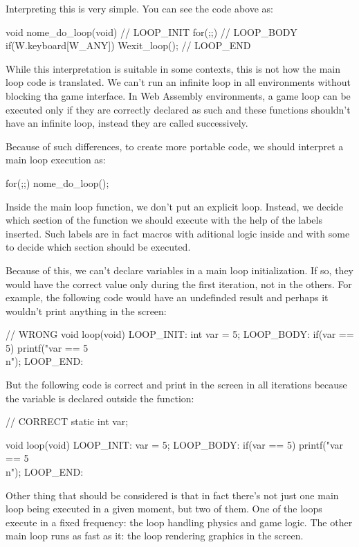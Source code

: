 Interpreting this is very simple. You can see the code above as:

\alinhaverbatim
void nome\_do\_loop(void){
  // LOOP\_INIT
  for(;;){
    // LOOP\_BODY
    if(W.keyboard[W\_ANY])
        Wexit\_loop();
  }
  // LOOP\_END
}
\alinhanormal

While this interpretation is suitable in some contexts, this is not
how the main loop code is translated. We can't run an infinite loop in
all environments without blocking tha game interface. In Web Assembly
environments, a game loop can be executed only if they are correctly
declared as such and these functions shouldn't have an infinite loop,
instead they are called successively.

Because of such differences, to create more portable code, we should
interpret a main loop execution as:

\alinhaverbatim
for(;;)
  nome\_do\_loop();
\alinhanormal

Inside the main loop function, we don't put an explicit loop. Instead,
we decide which section of the function we should execute with the
help of the labels inserted. Such labels are in fact macros with
aditional logic inside and with some  to decide which
section should be executed.

Because of this, we can't declare variables in a main loop
initialization. If so, they would have the correct value only during
the first iteration, not in the others. For example, the following
code would have an undefinded result and perhaps it wouldn't print
anything in the screen:

\alinhaverbatim
// WRONG
void loop(void){
LOOP\_INIT:
  int var = 5;
LOOP\_BODY:
  if(var == 5)
    printf("var == 5\\n");
LOOP\_END:
}
\alinhanormal

But the following code is correct and print in the screen in all
iterations because the variable is declared outside the function:

\alinhaverbatim
// CORRECT
static int var;

void loop(void){
LOOP\_INIT:
  var = 5;
LOOP\_BODY:
  if(var == 5)
    printf("var == 5\\n");
LOOP\_END:
}
\alinhanormal

Other thing that should be considered is that in fact there's not just
one main loop being executed in a given moment, but two of them. One
of the loops execute in a fixed frequency: the loop handling physics
and game logic. The other main loop runs as fast as it: the loop
rendering graphics in the screen.


